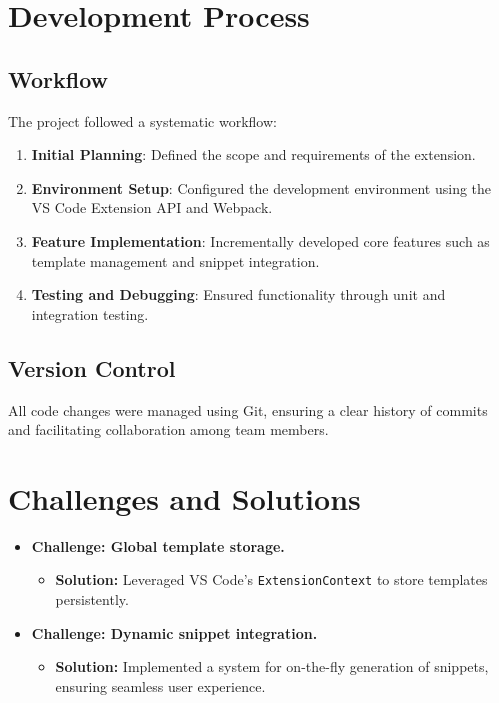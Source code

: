 \documentclass{article}
\begin{document}
\section{Development Process}
\subsection{Workflow}
The project followed a systematic workflow:
\begin{enumerate}
    \item \textbf{Initial Planning}: Defined the scope and requirements of the extension.
    \item \textbf{Environment Setup}: Configured the development environment using the VS Code Extension API and Webpack.
    \item \textbf{Feature Implementation}: Incrementally developed core features such as template management and snippet integration.
    \item \textbf{Testing and Debugging}: Ensured functionality through unit and integration testing.
\end{enumerate}

\subsection{Version Control}
All code changes were managed using Git, ensuring a clear history of commits and facilitating collaboration among team members.

\section{Challenges and Solutions}
\begin{itemize}
    \item \textbf{Challenge: Global template storage.}
    \begin{itemize}
        \item \textbf{Solution:} Leveraged VS Code's \texttt{ExtensionContext} to store templates persistently.
    \end{itemize}
    \item \textbf{Challenge: Dynamic snippet integration.}
    \begin{itemize}
        \item \textbf{Solution:} Implemented a system for on-the-fly generation of snippets, ensuring seamless user experience.
    \end{itemize}
\end{itemize}
\end{document}

